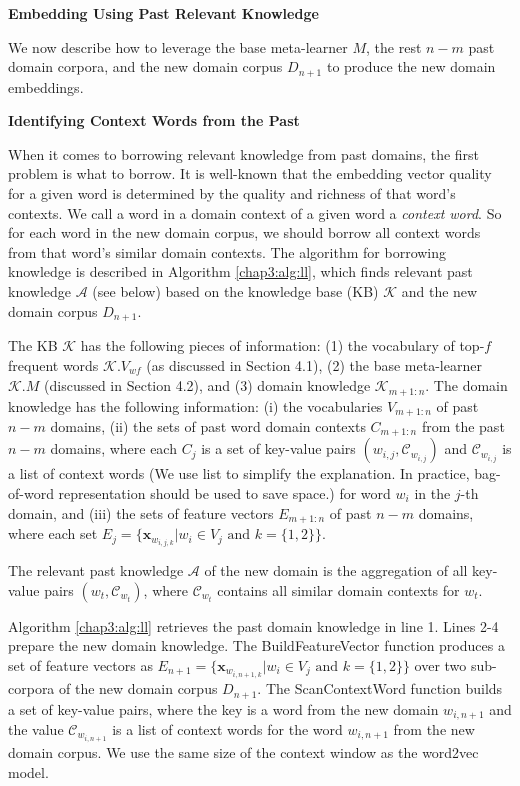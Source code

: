 \textbf{Embedding Using Past Relevant Knowledge}

We now describe how to leverage the base meta-learner $M$, the rest $n-m$ past domain corpora, and the new domain corpus $D_{n+1}$ to produce the new domain embeddings.

\textbf{Identifying Context Words from the Past}

When it comes to borrowing relevant knowledge from past domains, the first problem is what to borrow.
It is well-known that the embedding vector quality for a given word is determined by the quality and richness of that word's contexts.
We call a word in a domain context of a given word a \emph{context word}.
So for each word in the new domain corpus, we should borrow all context words from that word's similar domain contexts.
The algorithm for borrowing knowledge is described in Algorithm \ref{chap3:alg:ll}, which finds relevant past knowledge $\mathcal{A}$ (see below) based on the
knowledge base (KB) $\mathcal{K}$ and the new domain corpus $D_{n+1}$.

The KB $\mathcal{K}$ has the following pieces of information:
(1) the vocabulary of top-$f$ frequent words $\mathcal{K}.V_{\textit{wf}}$ (as discussed in Section 4.1), 
(2) the base meta-learner $\mathcal{K}.M$ (discussed in Section 4.2),
and (3) domain knowledge $\mathcal{K}_{m+1:n}$.
The domain knowledge has the following information:
(i) the vocabularies $V_{m+1:n}$ of past $n-m$ domains,
(ii) the sets of past word domain contexts $C_{m+1:n}$ from the past $n-m$ domains, where each $C_j$ is a set of key-value pairs $(w_{i,j}, \mathcal{C}_{w_{i,j} } )$ and $\mathcal{C}_{w_{i,j} } $ is a list of context words (We use list to simplify the explanation. In practice, bag-of-word representation should be used to save space.) for word $w_i$ in the $j$-th domain, 
and (iii) the sets of feature vectors $E_{m+1:n}$ of past $n-m$ domains, where each set $E_{j}=\{ \mathbf{x}_{w_{i, j, k}} | w_i \in V_{j} \text{ and } k=\{1, 2\} \}$.

The relevant past knowledge $\mathcal{A}$ of the new domain is the aggregation of all key-value pairs $(w_t, \mathcal{C}_{w_t})$, where $\mathcal{C}_{w_t}$ contains all similar domain contexts for $w_t$.

Algorithm \ref{chap3:alg:ll} retrieves the past domain knowledge in line 1.
Lines 2-4 prepare the new domain knowledge.
The BuildFeatureVector function produces a set of feature vectors as $E_{n+1}=\{ \mathbf{x}_{w_{i, n+1, k}} | w_i \in V_{j} \text{ and } k=\{1, 2\}\}$ over two sub-corpora of the new domain corpus $D_{n+1}$.
The ScanContextWord function builds a set of key-value pairs, where the key is a word from the new domain $w_{i, n+1}$ and the value $\mathcal{C}_{w_{i,n+1} } $ is a list of context words for the word $w_{i, n+1}$ from the new domain corpus. We use the same size of the context window as the word2vec model.

